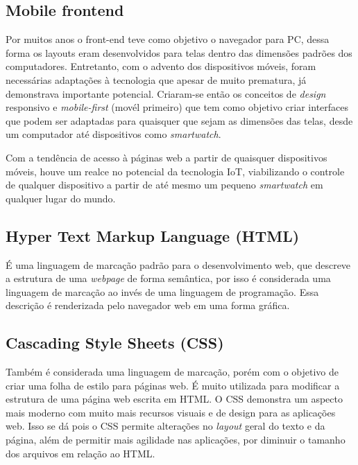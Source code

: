 \documentclass[../../layout.tex]{subfiles}
\begin{document}
\subsection{Mobile frontend}
\hspace*{3em}Por  muitos anos o front-end teve como objetivo o navegador para PC, dessa forma os layouts eram desenvolvidos para telas dentro das dimensões padrões dos computadores. Entretanto, com o advento dos dispositivos móveis, foram necessárias adaptações à tecnologia que apesar de muito prematura, já demonstrava importante potencial. Criaram-se então os conceitos de \emph{design} responsivo e \emph{mobile-first} (movél primeiro) que tem como objetivo criar interfaces que podem ser adaptadas para quaisquer que sejam as dimensões das telas, desde um computador até dispositivos como \emph{smartwatch}.\par
Com a tendência de acesso à páginas web a partir de quaisquer dispositivos móveis, houve um realce no potencial da tecnologia IoT, viabilizando o controle de qualquer dispositivo a partir de até mesmo um pequeno \emph{smartwatch} em qualquer lugar do mundo.\cite{mobilefrontend}

\subsection{Hyper Text Markup Language (HTML)}
\hspace*{3em}É uma linguagem de marcação padrão para o desenvolvimento web, que descreve a estrutura de uma \emph{webpage} de forma semântica, por isso é considerada uma linguagem de marcação ao invés de uma linguagem de programação. Essa descrição é renderizada pelo navegador web em uma forma gráfica.\cite{frontend}

\subsection{Cascading Style Sheets (CSS)}
\hspace*{3em}Também é considerada uma linguagem de marcação, porém com o objetivo de criar uma folha de estilo para páginas web. É muito utilizada para modificar a estrutura de uma página web escrita em HTML. O CSS demonstra um aspecto mais moderno com muito mais recursos visuais e de design para as aplicações web. Isso se dá pois o CSS permite alterações no \emph{layout} geral do texto e da página, além de permitir mais agilidade nas aplicações, por diminuir o tamanho dos arquivos em relação ao HTML.\cite{frontend}
\end{document}
